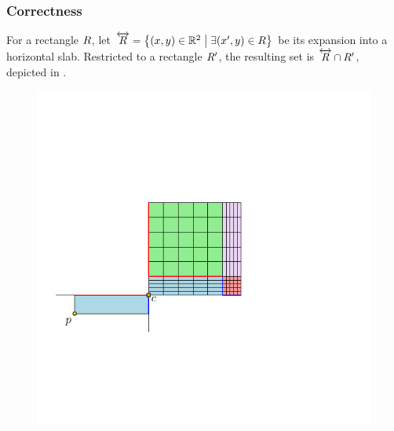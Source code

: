 \documentclass[12pt]{article}%
\begin{document}
\newcommand{\xSlabX}[1]{\overleftrightarrow{#1}}
\subsubsection{Correctness}


For a rectangle $R$, let
$\xSlabX{\rect} = \Set{(x,y)\in \Re^2}{\exists (x',y) \in \rect}$ be
its expansion into a horizontal slab. Restricted to a rectangle
$R'$, the resulting set is $\xSlabX{\rect} \cap \rect'$, depicted
in .

\begin{figure}[h]
    \includegraphics[page=2]{figs/grid_2}%
    \hfill%

\end{figure}
\end{document}
